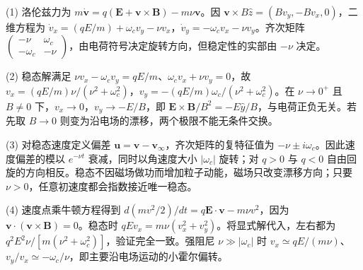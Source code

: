 (1) 洛伦兹力为 \(m\dot{\mathbf v}=q(\mathbf E+\mathbf v\times\mathbf B)-m\nu\mathbf v\)。因 \(\mathbf v\times B\hat z=(Bv_y,-Bv_x,0)\)，二维方程为 \(\dot v_x=(qE/m)+\omega_cv_y-\nu v_x\)，\(\dot v_y=-\omega_cv_x-\nu v_y\)。齐次矩阵 \(\begin{pmatrix}-\nu&\omega_c\\-\omega_c&-\nu\end{pmatrix}\)，由电荷符号决定旋转方向，但稳定性的实部由 \(-\nu\) 决定。

(2) 稳态解满足 \(\nu v_x-\omega_cv_y=qE/m\)、\(\omega_cv_x+\nu v_y=0\)，故 \(v_x=(qE/m)\nu/(\nu^2+\omega_c^2)\)，\(v_y=-(qE/m)\omega_c/(\nu^2+\omega_c^2)\)。在 \(\nu\to0^+\) 且 \(B\ne0\) 下，\(v_x\to0\)，\(v_y\to-E/B\)，即 \(\mathbf E\times\mathbf B/B^2=-E\hat y/B\)，与电荷正负无关。若先取 \(B\to0\) 则变为沿电场的漂移，两个极限不能无条件交换。

(3) 对稳态速度定义偏差 \(\mathbf u=\mathbf v-\mathbf v_\infty\)，齐次矩阵的复特征值为 \(-\nu\pm i\omega_c\)。因此速度偏差的模以 \(e^{-\nu t}\) 衰减，同时以角速度大小 \(|\omega_c|\) 旋转；对 \(q>0\) 与 \(q<0\) 自由回旋的方向相反。稳态不因磁场做功而增加粒子动能，磁场只改变漂移方向；只要 \(\nu>0\)，任意初速度都会指数接近唯一稳态。

(4) 速度点乘牛顿方程得到 \(d(mv^2/2)/dt=q\mathbf E\cdot\mathbf v-m\nu v^2\)，因为 \(\mathbf v\cdot(\mathbf v\times\mathbf B)=0\)。稳态时 \(qEv_x=m\nu(v_x^2+v_y^2)\)。将显式解代入，左右都为 \(q^2E^2\nu/[m(\nu^2+\omega_c^2)]\)，验证完全一致。强阻尼 \(\nu\gg|\omega_c|\) 时 \(v_x\simeq qE/(m\nu)\)、\(v_y/v_x\simeq-\omega_c/\nu\)，即主要沿电场运动的小霍尔偏转。
